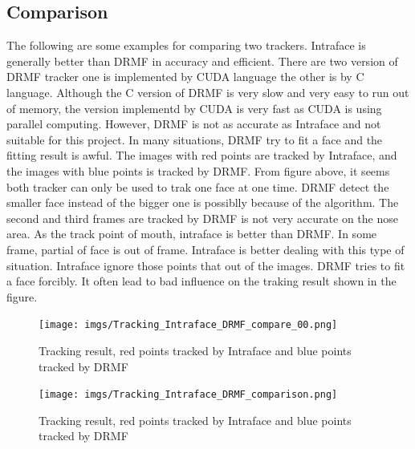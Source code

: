 \subsection{Comparison}
The following are some examples for comparing two trackers. Intraface is generally better than DRMF in accuracy and efficient. There are two version of DRMF tracker one is implemented by CUDA language the other is by C language. Although the C version of DRMF is very slow and very easy to run out of memory, the version implementd by CUDA is very fast as CUDA is using parallel computing. However, DRMF is not as accurate as Intraface and not suitable for this project. In many situations, DRMF try to fit a face and the fitting result is awful. The images with red points are tracked by Intraface, and the images with blue points is tracked by DRMF.
\newline
From figure above, it seems both tracker can only be used to trak one face at one time. DRMF detect the smaller face instead of the bigger one is possiblly because of the algorithm. The second and third frames are tracked by DRMF is not very accurate on the nose area. As the track point of mouth, intraface is better than DRMF.
In some frame, partial of face is out of frame. Intraface is better dealing with this type of situation. Intraface ignore those points that out of the images. DRMF tries to fit a face forcibly. It often lead to bad influence on the traking result shown in the figure.
\begin{figure}[p]
\centering
\texttt{[image: imgs/Tracking\_Intraface\_DRMF\_compare\_00.png]}
\caption{Tracking result, red points tracked by Intraface and blue points tracked by DRMF}
\texttt{[image: imgs/Tracking\_Intraface\_DRMF\_comparison.png]}
\caption{Tracking result, red points tracked by Intraface and blue points tracked by DRMF}
\end{figure}
\newpage
